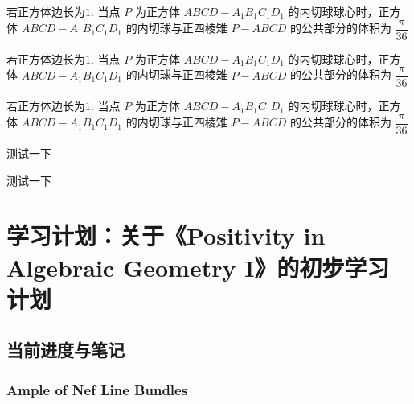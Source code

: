 \documentclass[lang=cn,12pt,fontset=none,a4paper]{beautybook}
\begin{document}
\begin{RemarK}[正四棱锥与球的公共部分体积]\label{Remark:2}
    若正方体边长为$1$. 当点 $P$ 为正方体 $A B C D-A_1 B_1 C_1 D_1$ 的内切球球心时，正方体 $A B C D-A_1 B_1 C_1 D_1$ 的内切球与正四棱雉 $P-A B C D$ 的公共部分的体积为 $\dfrac{\pi}{36}$
\end{RemarK}


\begin{Example}[正四棱锥与球的公共部分体积]\label{Example:2}
    若正方体边长为$1$. 当点 $P$ 为正方体 $A B C D-A_1 B_1 C_1 D_1$ 的内切球球心时，正方体 $A B C D-A_1 B_1 C_1 D_1$ 的内切球与正四棱雉 $P-A B C D$ 的公共部分的体积为 $\dfrac{\pi}{36}$
\end{Example}

\begin{Problem}[正四棱锥与球的公共部分体积]\label{Problem:2}
    若正方体边长为$1$. 当点 $P$ 为正方体 $A B C D-A_1 B_1 C_1 D_1$ 的内切球球心时，正方体 $A B C D-A_1 B_1 C_1 D_1$ 的内切球与正四棱雉 $P-A B C D$ 的公共部分的体积为 $\dfrac{\pi}{36}$
\end{Problem}
\begin{Proof}
测试一下
\end{Proof}

\begin{Solution}
测试一下
\end{Solution}


\chapter{学习计划：关于《Positivity in Algebraic Geometry I》的初步学习计划}
\section{当前进度与笔记}
\subsection{Ample of Nef Line Bundles}

\clearpage
\printbibliography[heading=bibintoc,title={Bibliography}]\printindex\thispagestyle{empty}
\ISBNcode{\EANisbn[ISBN=978-80-7340-097-2]} %
\makebottomcover
\end{document}
